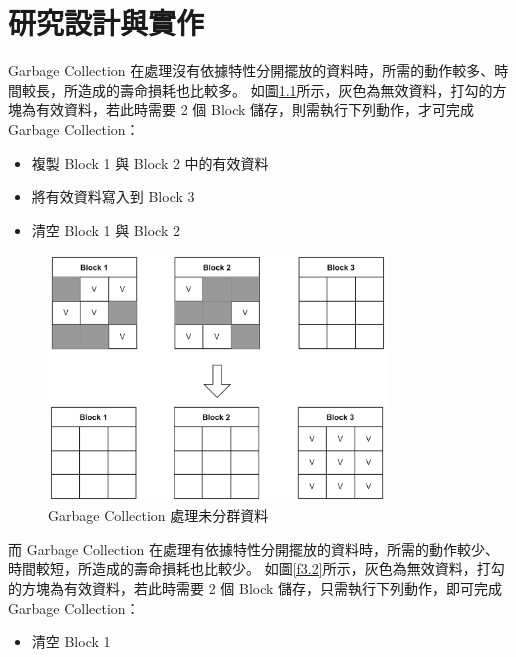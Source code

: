 \chapter{研究設計與實作}
\indent
Garbage Collection 在處理沒有依據特性分開擺放的資料時，所需的動作較多、時間較長，所造成的壽命損耗也比較多。
如圖\ref{f3.1}所示，灰色為無效資料，打勾的方塊為有效資料，若此時需要 2 個 Block 儲存，則需執行下列動作，才可完成 Garbage Collection：

\begin{itemize}
    \item 複製 Block 1 與 Block 2 中的有效資料
    \item 將有效資料寫入到 Block 3
    \item 清空 Block 1 與 Block 2
\end{itemize}

\begin{figure}[H]
    \centering
    \includegraphics[width=0.8\textwidth]{picture/ch3/gc_efficiency_1.png}
    \caption{Garbage Collection 處理未分群資料}
    \label{f3.1}
\end{figure}

\newpage
\indent
而 Garbage Collection 在處理有依據特性分開擺放的資料時，所需的動作較少、時間較短，所造成的壽命損耗也比較少。
如圖\ref{f3.2}所示，灰色為無效資料，打勾的方塊為有效資料，若此時需要 2 個 Block 儲存，只需執行下列動作，即可完成 Garbage Collection：

\begin{itemize}
    \item 清空 Block 1
\end{itemize}

